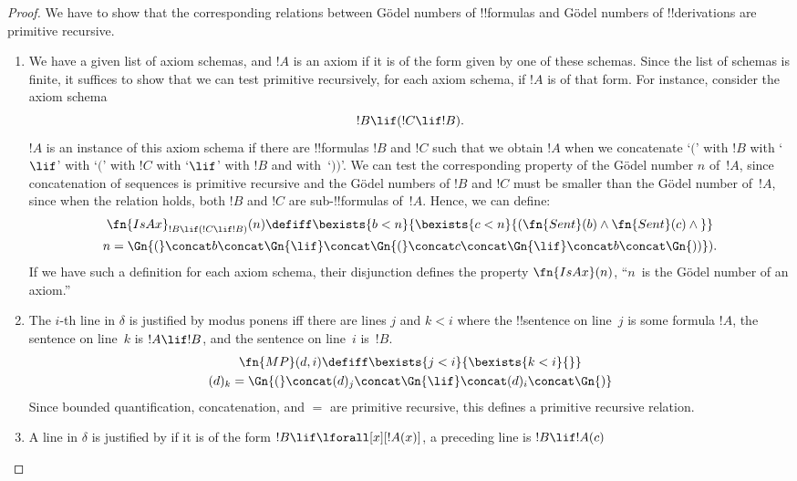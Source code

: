 \documentclass[../../../include/open-logic-section]{subfiles}
\begin{document}
\begin{proof}
We have to show that the corresponding relations between G\"odel
numbers of !!{formula}s and  G\"odel numbers of !!{derivation}s 
are primitive recursive.
\begin{enumerate}
\item We have a given list of axiom schemas, and $!A$ is an axiom if
  it is of the form given by one of these schemas.  Since the list of
  schemas is finite, it suffices to show that we can test primitive
  recursively, for each axiom schema, if $!A$ is of that form. For
  instance, consider the axiom schema
  \[
  !B \lif (!C \lif !B).
  \]
  $!A$ is an instance of this axiom schema if there are !!{formula}s
  $!B$ and $!C$ such that we obtain $!A$ when we concatenate `$($'
  with $!B$ with `$\lif$' with `$($' with $!C$ with `$\lif$' with $!B$
  and with~`$))$'. We can test the corresponding property of the
  G\"odel number $n$ of~$!A$, since concatenation of sequences is
  primitive recursive and the G\"odel numbers of $!B$ and $!C$ must
  be smaller than the G\"odel number of~$!A$, since when the relation
  holds, both $!B$ and $!C$ are sub-!!{formula}s of~$!A$. Hence, we
  can define:
  \begin{multline*}
  \fn{IsAx}_{!B \lif (!C \lif !B)}(n) \defiff \bexists{b< n}{
    \bexists{c < n}{(\fn{Sent}(b) \land \fn{Sent}(c) \land {}}}\\ n =
  \Gn{(} \concat b \concat \Gn{\lif} \concat \Gn{(} \concat c \concat
  \Gn{\lif} \concat b \concat \Gn{))}).
  \end{multline*}
  If we have such a definition for each axiom schema, their
  disjunction defines the property $\fn{IsAx}(n)$, ``$n$~is the
  G\"odel number of an axiom.''
\item The $i$-th line in $\delta$ is justified by modus ponens iff there
  are lines $j$ and $k < i$ where the !!{sentence} on line~$j$ is some
  formula $!A$, the sentence on line~$k$ is $!A \lif !B$, and the
  sentence on line~$i$ is~$!B$.
  \begin{multline*}
    \fn{MP}(d, i) \defiff \bexists{j < i}{\bexists{k < i}{}}\\
    (d)_k = \Gn{(} \concat (d)_j
      \concat \Gn{\lif} \concat (d)_i \concat \Gn{)}
  \end{multline*}
  Since bounded quantification, concatenation, and $=$ are primitive
  recursive, this defines a primitive recursive relation. 
\item A line in $\delta$ is justified by \QR{} if it is of the form
  $!B \lif \lforall[x][!A(x)]$, a preceding line is $!B \lif !A(c)$

\end{enumerate}
\end{proof}
\end{document}
